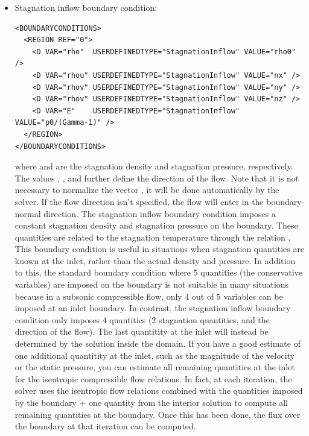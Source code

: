 \begin{itemize}
\item Stagnation inflow boundary condition:
\begin{lstlisting}[style=XmlStyle]
<BOUNDARYCONDITIONS>
  <REGION REF="0">
    <D VAR="rho"  USERDEFINEDTYPE="StagnationInflow" VALUE="rho0" />
    <D VAR="rhou" USERDEFINEDTYPE="StagnationInflow" VALUE="nx" />
    <D VAR="rhov" USERDEFINEDTYPE="StagnationInflow" VALUE="ny" />
    <D VAR="rhov" USERDEFINEDTYPE="StagnationInflow" VALUE="nz" />
    <D VAR="E"    USERDEFINEDTYPE="StagnationInflow" VALUE="p0/(Gamma-1)" />
  </REGION>
</BOUNDARYCONDITIONS>
\end{lstlisting}
where  and  are the stagnation density and stagnation pressure, respectively.
The values , , and  further define the direction of the flow. Note that 
it is not necessary to normalize the vector , it will be done automatically by the 
solver. If the flow direction isn't specified, the flow will enter in the boundary-normal direction.
The stagnation inflow boundary condition imposes a constant stagnation density and stagnation pressure 
on the boundary. These quantities are related to the stagnation temperature through the relation
. This boundary condition is useful in situations when stagnation
quantities are known at the inlet, rather than the actual density and pressure. In addition to this, the
standard boundary condition where 5 quantities (the conservative variables) are imposed on the boundary
is not suitable in many situations because in a subsonic compressible flow, only 4 out of 5 variables
can be imposed at an inlet boundary. In contrast, the stagnation inflow boundary condition only imposes
4 quantities (2 stagnation quantities, and the direction of the flow). The last quantitity at the inlet
will instead be determined by the solution inside the domain. If you have a good estimate of one additional 
quantitity at the inlet, such as the magnitude of the velocity or the static pressure, you can estimate 
all remaining quantities at the inlet for the isentropic compressible flow relations. In fact, at each 
iteration, the solver uses the isentropic flow relations combined with the quantities imposed by the
boundary + one quantity from the interior solution to compute all remaining quantities at the boundary.
Once this has been done, the flux over the boundary at that iteration can be computed.


\end{itemize}
